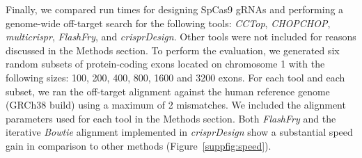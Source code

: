 \documentclass[pdftex,english,10pt]{article}
\begin{document}
Finally, we compared run times for designing SpCas9 gRNAs and performing a genome-wide off-target search for the following tools: \textit{CCTop}, \textit{CHOPCHOP}, \textit{multicrispr}, \textit{FlashFry}, and \textit{crisprDesign}. Other tools were not included for reasons discussed in the Methods section. To perform the evaluation, we generated six random subsets of protein-coding exons located on chromosome 1 with the following sizes: 100, 200, 400, 800, 1600 and 3200 exons. For each tool and each subset, we ran the off-target alignment against the human reference genome (GRCh38 build) using a maximum of 2 mismatches. We included the alignment parameters used for each tool in the Methods section. Both \textit{FlashFry} and the iterative \textit{Bowtie} alignment implemented in \textit{crisprDesign} show a substantial speed gain in comparison to other methods (Figure~\ref{suppfig:speed}).
\end{document}
